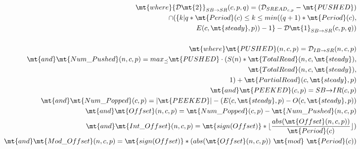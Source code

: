 \begin{itemize}
\begin{align*}
\mt{where }{{\cal D}\mt{2}}_{SB {\small \rightarrow} SR}(c,p,q) = 
  ({\cal D}_{{SREAD}_{c, p}} - \mt{PUSHED}) \\
                         \cap ( \{ k | q * \mt{Period}(c)
                                      \le k 
                                      \le min((q+1)*\mt{Period}(c),  \\
                                              E(c, \mt{steady}, p)) - 1 \} - {{\cal D}\mt{1}}_{SB {\small \rightarrow} SR}(c,p,q) ) \\ ~ \\
%
%
\mt{where }\mt{PUSHED}(n,c,p) = {\cal D}_{IB {\small \rightarrow} SR}(n,c,p) \\
\mt{and }\mt{Num\_Pushed}(n,c,p) = 
  max_{\preceq}\mt{PUSHED} \cdot (S(n) * \mt{TotalRead}(n,c,\mt{steady}), \\
                                        \mt{TotalRead}(n,c,\mt{steady}), \\
                                        1 ) + \mt{PartialRead}(c, \mt{steady}, p) \\
\mt{and }\mt{PEEKED}(c,p) = {SB {\small \rightarrow} IR}(c,p) \\
\mt{and }\mt{Num\_Popped}(c,p) = |\mt{PEEKED}| - (E(c,\mt{steady},p) - O(c,\mt{steady},p)) \\
\mt{and }\mt{Offset}(n,c,p) = \mt{Num\_Popped}(c,p)-\mt{Num\_Pushed}(n,c,p) \\
\mt{and }\mt{Int\_Offset}(n,c,p) = \mt{sign(Offset)}*\lfloor \frac{abs(\mt{Offset}(n,c,p))}{\mt{Period}(c)} \rfloor) \\
\mt{and }\mt{Mod\_Offset}(n,c,p) = \mt{sign(Offset)}*(abs(\mt{Offset}(n,c,p))~\mt{mod}~\mt{Period}(c)) \\
%
\end{align*}
%
\end{itemize}


